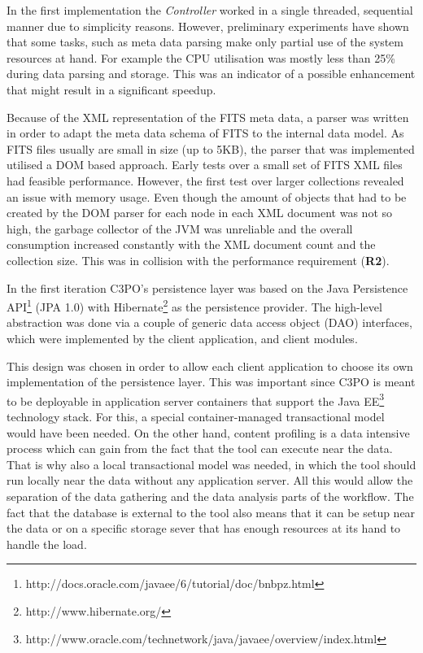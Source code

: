 In the first implementation the \textit{Controller} worked in a single threaded, sequential manner due to simplicity reasons. However, preliminary experiments have shown that some tasks, such as meta data parsing make only partial use of the system resources at hand. For example the CPU utilisation was mostly less than 25\% during data parsing and storage. This was an indicator of a possible enhancement that might result in a significant speedup.

Because of the XML representation of the FITS meta data, a parser was written in order to adapt the meta data schema of FITS to the internal data model. As FITS files usually are small in size (up to 5KB), the parser that was implemented utilised a DOM based approach. Early tests over a small set of FITS XML files had feasible performance. However, the first test over larger collections revealed an issue with memory usage. Even though the amount of objects that had to be created by the DOM parser for each node in each XML document was not so high, the garbage collector of the JVM was unreliable and the overall consumption increased constantly with the XML document count and the collection size. This was in collision with the performance requirement (\textbf{R2}).

In the first iteration C3PO's persistence layer was based on the Java Persistence API\footnote{http://docs.oracle.com/javaee/6/tutorial/doc/bnbpz.html} (JPA 1.0) with Hibernate\footnote{http://www.hibernate.org/} as the persistence provider. The high-level abstraction was done via a couple of generic data access object (DAO) interfaces, which were implemented by the client application, and client modules.

This design was chosen in order to allow each client application to choose its own implementation of the persistence layer. This was important since C3PO is meant to be deployable in application server containers that support the Java EE\footnote{http://www.oracle.com/technetwork/java/javaee/overview/index.html} technology stack. For this, a special container-managed transactional model would have been needed. On the other hand, content profiling is a data intensive process which can gain from the fact that the tool can execute near the data. That is why also a local transactional model was needed, in which the tool should run locally near the data without any application server. All this would allow the separation of the data gathering and the data analysis parts of the workflow. The fact that the database is external to the tool also means that it can be setup near the data or on a specific storage sever that has enough resources at its hand to handle the load.

